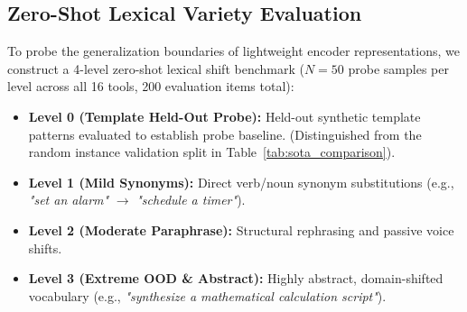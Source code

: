 \documentclass[conference]{IEEEtran}
\begin{document}
\begin{table}[t]
\caption{Ablation analysis isolating component gains across routing head, sequence tagger, tag schema, trunk freezing, and LoRA adaptation.}
\label{tab:ablation_summary}
\begin{center}
\footnotesize
{}
\end{center}
\end{table}

\subsection{Zero-Shot Lexical Variety Evaluation}
To probe the generalization boundaries of lightweight encoder representations, we construct a 4-level zero-shot lexical shift benchmark ($N=50$ probe samples per level across all 16 tools, 200 evaluation items total):
\begin{itemize}
    \item \textbf{Level 0 (Template Held-Out Probe):} Held-out synthetic template patterns evaluated to establish probe baseline. (Distinguished from the random instance validation split in Table~\ref{tab:sota_comparison}).
    \item \textbf{Level 1 (Mild Synonyms):} Direct verb/noun synonym substitutions (e.g., \emph{"set an alarm"} $\rightarrow$ \emph{"schedule a timer"}).
    \item \textbf{Level 2 (Moderate Paraphrase):} Structural rephrasing and passive voice shifts.
    \item \textbf{Level 3 (Extreme OOD \& Abstract):} Highly abstract, domain-shifted vocabulary (e.g., \emph{"synthesize a mathematical calculation script"}).
\end{itemize}
\end{document}
